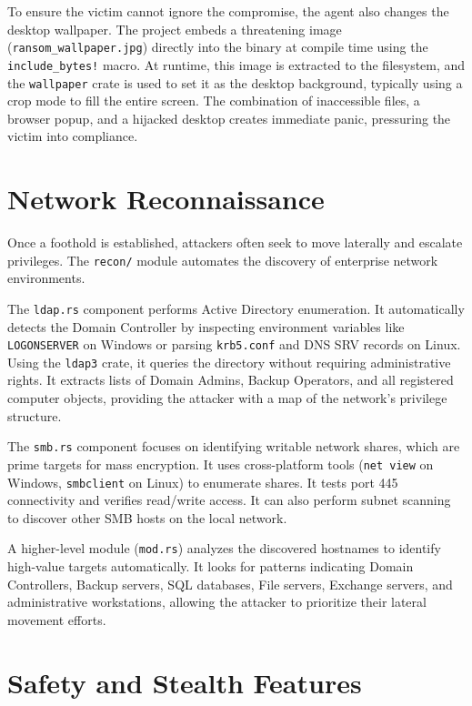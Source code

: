 \documentclass[12pt,a4paper]{article}
\newcommand{\code}[1]{\texttt{\textcolor{primaryblue}{#1}}}
\begin{document}
To ensure the victim cannot ignore the compromise, the agent also changes the desktop wallpaper. The project embeds a threatening image (\code{ransom\_wallpaper.jpg}) directly into the binary at compile time using the \code{include\_bytes!} macro. At runtime, this image is extracted to the filesystem, and the \code{wallpaper} crate is used to set it as the desktop background, typically using a crop mode to fill the entire screen. The combination of inaccessible files, a browser popup, and a hijacked desktop creates immediate panic, pressuring the victim into compliance.

\section{Network Reconnaissance}

Once a foothold is established, attackers often seek to move laterally and escalate privileges. The \code{recon/} module automates the discovery of enterprise network environments.

The \code{ldap.rs} component performs Active Directory enumeration. It automatically detects the Domain Controller by inspecting environment variables like \code{LOGONSERVER} on Windows or parsing \code{krb5.conf} and DNS SRV records on Linux. Using the \code{ldap3} crate, it queries the directory without requiring administrative rights. It extracts lists of Domain Admins, Backup Operators, and all registered computer objects, providing the attacker with a map of the network's privilege structure.

The \code{smb.rs} component focuses on identifying writable network shares, which are prime targets for mass encryption. It uses cross-platform tools (\code{net view} on Windows, \code{smbclient} on Linux) to enumerate shares. It tests port 445 connectivity and verifies read/write access. It can also perform subnet scanning to discover other SMB hosts on the local network.

A higher-level module (\code{mod.rs}) analyzes the discovered hostnames to identify high-value targets automatically. It looks for patterns indicating Domain Controllers, Backup servers, SQL databases, File servers, Exchange servers, and administrative workstations, allowing the attacker to prioritize their lateral movement efforts.

\section{Safety and Stealth Features}
\end{document}
